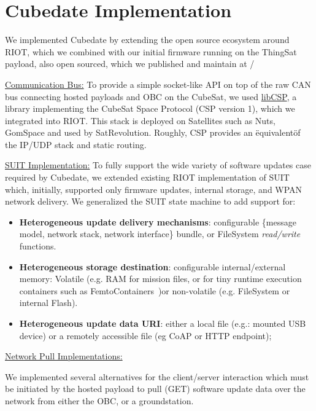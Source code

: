 \section{Cubedate Implementation}
\label{sec:implementation}

We implemented Cubedate by extending the open source ecosystem around RIOT, which we combined with
our initial firmware running on the ThingSat payload, also open sourced, which we published and
maintain at \cite*{git:cubedate-repo}/

\underline{Communication Bus:}
To provide a simple socket-like API on top of the raw CAN bus connecting hosted
payloads and OBC on the CubeSat, we used \href{https://github.com/libcsp/libcsp}{libCSP},
a library implementing the CubeSat Space Protocol (CSP version 1), which we integrated into RIOT.
This stack is deployed on Satellites such as Nuts\cite{bezem2013nutsAuthenticatedUplink}, GomSpace
and used by SatRevolution. Roughly, CSP provides an \"equivalent\" of the IP/UDP stack
and static routing.

\underline{SUIT Implementation:}
To fully support the wide variety of software updates case required by Cubedate, we
extended existing RIOT implementation of SUIT~\cite{zandberg2019secure} which,
initially, supported only firmware updates, internal storage, and WPAN network delivery.
We generalized the SUIT state machine to add support for:

\begin{itemize}
    \item \textbf{Heterogeneous update delivery mechanisms}: configurable \{message model,
    network stack, network interface\} bundle, or FileSystem \textit{read/write} functions.
    \item \textbf{Heterogeneous storage destination}: configurable internal/external memory:
    Volatile (e.g. RAM for mission files, or for tiny runtime execution containers such as
    FemtoContainers~\cite{zandberg2021femto})or non-volatile (e.g. FileSystem or internal Flash).
    \item \textbf{Heterogeneous update data URI}: either a local file (e.g.: mounted USB device)
    or a remotely accessible file (eg CoAP or HTTP endpoint);
\end{itemize}

\underline{Network Pull Implementations:}

\iffalse
We implemented several alternatives for the client/server interaction which
must be initiated by the hosted payload to pull (GET) software update data over the
network from either the OBC, or a groundstation.


